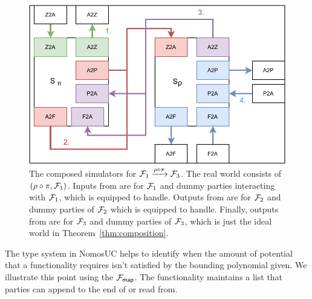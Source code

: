 \begin{figure}
\centering
\includegraphics[scale=0.5]{figures/simcomp.pdf}
\caption{The composed simulators for $\mathcal{F}_1 \xrightarrow{\rho \circ \pi} \mathcal{F}_3$. The real world consists of $(\rho \circ \pi, \mathcal{F}_1)$. Inputs from \Z are for $\mathcal{F}_1$ and dummy parties interacting with $\mathcal{F}_1$, which \SIM{\pi} is equipped to handle. Outputs from \SIM{\pi} are for $\mathcal{F}_2$ and dummy parties of $\mathcal{F}_2$ which \SIM{\rho} is equipped to handle. Finally, outputs from \SIM{\rho} are for $\mathcal{F}_3$ and dummy parties of $\mathcal{F}_3$, which is just the ideal world in Theorem~\ref{thm:composition}.}
\label{fig:simcomp}
\end{figure}


The type system in NomosUC helps to identify when the amount of potential that a functionality requires isn't satisfied by the bounding polynomial given.
We illustrate this point using the $\mathcal{F}_{{\mathsf {map}}}$. 
The functionality maintains a list that parties can append to the end of or read from.

